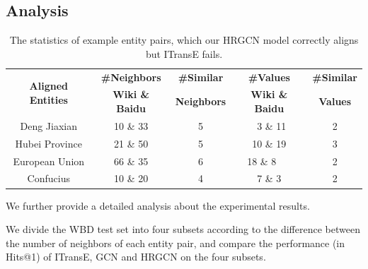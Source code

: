 	
	
	\subsection{Analysis}
	

\begin{table}
	\centering
	\small
	\begin{tabular}{ccccc}
		\toprule
		\multirow{2}{*}{\bf Aligned Entities} & \bf \#Neighbors & \bf \#Similar & \bf \#Values & \bf \#Similar \\
		&\bf  Wiki \& Baidu &\bf  Neighbors &\bf  Wiki \& Baidu &\bf  Values \\
		\midrule
		Deng Jiaxian & 10 \& 33 & 5 & \ 3 \& 11 & 2\\
		Hubei Province & 21 \& 50 & 5 & 10 \& 19 & 3\\
		European Union & 66 \& 35 & 6 & 18 \& 8\ \ \ & 2\\
		Confucius & 10 \& 20 & 4 & 7 \& 3 & 2\\
		\bottomrule
	\end{tabular}
	\caption{The statistics of example entity pairs, which our HRGCN model correctly aligns but ITransE fails.}
	\label{example}
\end{table}
	
	We further provide a detailed analysis about the experimental results.
	
	We divide the WBD test set into four subsets according to the difference between the number of neighbors of each entity pair, and compare the performance (in Hits@1) of ITransE, GCN and HRGCN on the four subsets.
	
